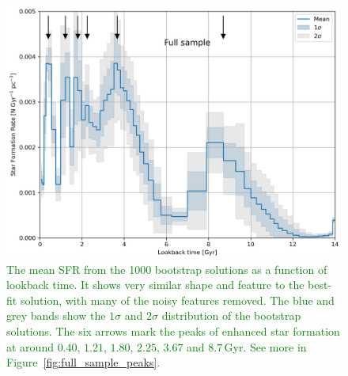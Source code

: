 \documentclass[fleqn,usenatbib]{mnras}
\begin{document}
\begin{figure}
    \centering
    \includegraphics[width=\columnwidth]{figures/fig_06_sfh_bootstrap_comparison.png}
    \caption{
    \textcolor{green}{The mean SFR from the 1000 bootstrap solutions as a
    function of lookback time. It shows very similar shape and feature to the
    best-fit solution, with many of the noisy features removed. The blue and
    grey bands show the $1\sigma$ and $2\sigma$ distribution of the bootstrap
    solutions. The six arrows mark the peaks of enhanced star formation at
    around $0.40$, $1.21$, $1.80$, $2.25$, $3.67$ and $8.7$\,Gyr. See more in
    Figure~\ref{fig:full_sample_peaks}.}
    }
    \label{fig:bootstrap_mean}
\end{figure}
\end{document}
